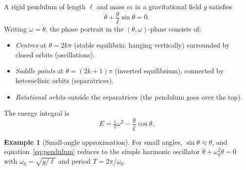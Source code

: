\documentclass[12pt,a4paper,openany]{book}
\theoremstyle{definition}
\newtheorem{example}[definition]{Example}
\theoremstyle{plain}
\theoremstyle{remark}
\begin{document}
A rigid pendulum of length $\ell$ and mass $m$ in a gravitational
field $g$ satisfies
\begin{equation}\label{eq:pendulum}
  \ddot{\theta} + \frac{g}{\ell}\sin\theta = 0.
\end{equation}
Writing $\omega=\dot{\theta}$, the phase portrait in the
$(\theta,\omega)$-plane consists of:
\begin{itemize}
  \item \emph{Centres} at $\theta=2k\pi$ (stable equilibria:
    hanging vertically) surrounded by closed orbits (oscillations).
  \item \emph{Saddle points} at $\theta=(2k+1)\pi$ (inverted
    equilibrium), connected by heteroclinic orbits (separatrices).
  \item \emph{Rotational orbits} outside the separatrices
    (the pendulum goes over the top).
\end{itemize}

The energy integral is
\[
  E = \tfrac{1}{2}\omega^{2} - \frac{g}{\ell}\cos\theta.
\]

\begin{center}
\end{center}

\begin{example}[Small-angle approximation]
\label{ex:pendulum-linear}
For small angles, $\sin\theta\approx\theta$, and
equation~\eqref{eq:pendulum} reduces to the simple harmonic oscillator
$\ddot{\theta}+\omega_{0}^{2}\theta=0$ with
$\omega_{0}=\sqrt{g/\ell}$ and period $T=2\pi/\omega_{0}$.
\end{example}
\end{document}
